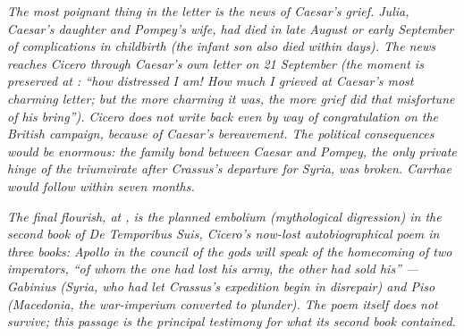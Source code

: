 \textit{The most poignant thing in the letter is the news of
Caesar's grief. Julia, Caesar's daughter and Pompey's wife,
had died in late August or early September of complications
in childbirth (the infant son also died within days). The
news reaches Cicero through Caesar's own letter on 21
September (the moment is preserved at : ``how
distressed I am! How much I grieved at Caesar's most charming
letter; but the more charming it was, the more grief did that
misfortune of his bring''). Cicero does not write back even by
way of congratulation on the British campaign, because of
Caesar's bereavement. The political consequences would be
enormous: the family bond between Caesar and Pompey, the only
private hinge of the triumvirate after Crassus's departure for
Syria, was broken. Carrhae would follow within seven months.}

\textit{The final flourish, at , is the planned
\textit{embolium} (mythological digression) in the second book
of \textit{De Temporibus Suis}, Cicero's now-lost autobiographical
poem in three books: Apollo in the council of the gods will
speak of the homecoming of two imperators, ``of whom the one
had lost his army, the other had sold his'' --- Gabinius (Syria,
who had let Crassus's expedition begin in disrepair) and Piso
(Macedonia, the war-imperium converted to plunder). The poem
itself does not survive; this passage is the principal
testimony for what its second book contained.}
